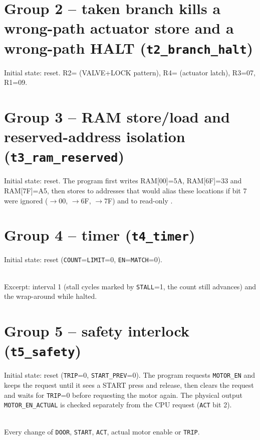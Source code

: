 \documentclass[10pt,a4paper]{article}
\begin{document}
\section{Group 2 -- taken branch kills a wrong-path actuator store and a wrong-path HALT (\texttt{t2\_branch\_halt})}
Initial state: reset. R2= (VALVE+LOCK pattern), R4= (actuator latch), R3=07, R1=09.
\begin{valtab}

\end{valtab}

\section{Group 3 -- RAM store/load and reserved-address isolation (\texttt{t3\_ram\_reserved})}
Initial state: reset. The program first writes RAM[00]=5A, RAM[6F]=33 and RAM[7F]=A5, then stores  to addresses that would alias
these locations if bit 7 were ignored ($\rightarrow$00, $\rightarrow$6F, $\rightarrow$7F) and to read-only
.
\begin{valtab}

\end{valtab}

\section{Group 4 -- timer (\texttt{t4\_timer})}
Initial state: reset (\texttt{COUNT}=\texttt{LIMIT}=0, \texttt{EN}=\texttt{MATCH}=0).
\begin{valtab}

\end{valtab}
\begin{center}\footnotesize
\\[2pt]
Excerpt: interval 1 (stall cycles marked by \texttt{STALL}=1, the count still advances) and the wrap-around while halted.
\end{center}

\section{Group 5 -- safety interlock (\texttt{t5\_safety})}
Initial state: reset (\texttt{TRIP}=0, \texttt{START\_PREV}=0). The program requests \texttt{MOTOR\_EN} and keeps the request
until it sees a START press and release, then clears the request and waits for \texttt{TRIP}=0 before requesting
the motor again. The physical output \texttt{MOTOR\_EN\_ACTUAL} is checked separately from the CPU request
(\texttt{ACT} bit 2).
\begin{valtab}

\end{valtab}
\begin{center}\footnotesize
\\[2pt]
Every change of \texttt{DOOR}, \texttt{START}, \texttt{ACT}, actual motor enable or \texttt{TRIP}.
\end{center}
\end{document}
